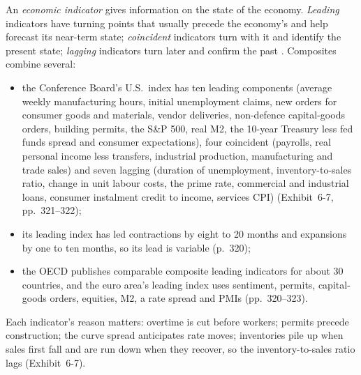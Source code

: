 \begin{qfmethod}\label{meth:business-cycle-indicators}
 An \emph{economic indicator} gives information on the state of the economy. \emph{Leading} indicators have turning points that usually precede the economy's and help forecast its near-term state; \emph{coincident} indicators turn with it and identify the present state; \emph{lagging} indicators turn later and confirm the past \citep[chap.~6, sec.~5, pp.~319--320]{economics-investment-decision-makers-2013}. Composites combine several:
\begin{itemize}
\item the Conference Board's U.S.\ index has ten leading components (average weekly manufacturing hours, initial unemployment claims, new orders for consumer goods and materials, vendor deliveries, non-defence capital-goods orders, building permits, the S\&P 500, real M2, the 10-year Treasury less fed funds spread and consumer expectations), four coincident (payrolls, real personal income less transfers, industrial production, manufacturing and trade sales) and seven lagging (duration of unemployment, inventory-to-sales ratio, change in unit labour costs, the prime rate, commercial and industrial loans, consumer instalment credit to income, services CPI) (Exhibit~6-7, pp.~321--322);
\item its leading index has led contractions by eight to 20 months and expansions by one to ten months, so its lead is variable (p.~320);
\item the OECD publishes comparable composite leading indicators for about 30 countries, and the euro area's leading index uses sentiment, permits, capital-goods orders, equities, M2, a rate spread and PMIs (pp.~320--323).
\end{itemize}
Each indicator's reason matters: overtime is cut before workers; permits precede construction; the curve spread anticipates rate moves; inventories pile up when sales first fall and are run down when they recover, so the inventory-to-sales ratio lags (Exhibit~6-7).


\end{qfmethod}
